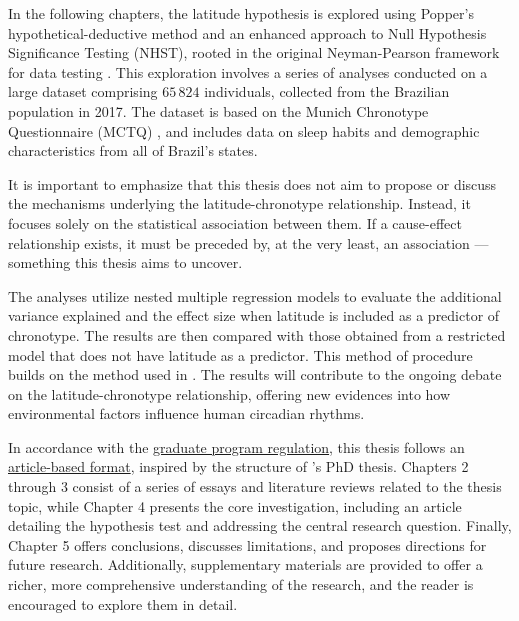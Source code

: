\documentclass[
12pt,
openright,
oneside,
a4paper,
chapter=TITLE,
section=TITLE,
french,
spanish,
brazil,
english
]{abntex2}\usepackage{array}
\begin{document}
In the following chapters, the latitude hypothesis is explored using
Popper's hypothetical-deductive method \autocite{popper1979} and an
enhanced approach to Null Hypothesis Significance Testing (NHST), rooted
in the original Neyman-Pearson framework for data testing
\autocite{neyman1928,neyman1928a,perezgonzalez2015}. This exploration
involves a series of analyses conducted on a large dataset comprising
\(65\,824\) individuals, collected from the Brazilian population in
2017. The dataset is based on the Munich Chronotype Questionnaire (MCTQ)
\autocite{roenneberg2003,roenneberg2012a}, and includes data on sleep
habits and demographic characteristics from all of Brazil's states.

It is important to emphasize that this thesis does not aim to propose or
discuss the mechanisms underlying the latitude-chronotype relationship.
Instead, it focuses solely on the statistical association between them.
If a cause-effect relationship exists, it must be preceded by, at the
very least, an association --- something this thesis aims to uncover.

The analyses utilize nested multiple regression models to evaluate the
additional variance explained and the effect size when latitude is
included as a predictor of chronotype. The results are then compared
with those obtained from a restricted model that does not have latitude
as a predictor. This method of procedure builds on the method used in
\textcite{leocadio-miguel2017}. The results will contribute to the
ongoing debate on the latitude-chronotype relationship, offering new
evidences into how environmental factors influence human circadian
rhythms.

In accordance with the
\href{https://leginf.usp.br/?resolucao=resolucao-copgr-no-7829-de-03-de-outubro-de-2019\#:~:text=XI\%20\%E2\%80\%93\%20PROCEDIMENTOS\%20PARA\%20DEP\%C3\%93SITO\%20DA\%20DISSERTA\%C3\%87\%C3\%83O}{graduate
program regulation}, this thesis follows an
\href{https://en.wikipedia.org/wiki/Collection_of_articles}{article-based
format}, inspired by the structure of \textcite{reis2020}'s PhD thesis.
Chapters 2 through 3 consist of a series of essays and literature
reviews related to the thesis topic, while Chapter 4 presents the core
investigation, including an article detailing the hypothesis test and
addressing the central research question. Finally, Chapter 5 offers
conclusions, discusses limitations, and proposes directions for future
research. Additionally, supplementary materials are provided to offer a
richer, more comprehensive understanding of the research, and the reader
is encouraged to explore them in detail.
\end{document}
